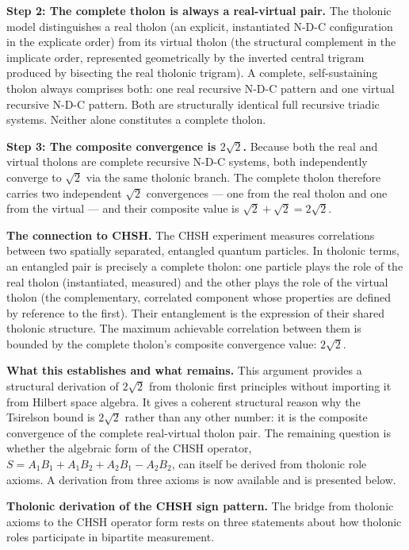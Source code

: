 \documentclass[12pt]{article}
\begin{document}
\textbf{Step 2: The complete tholon is always a real-virtual pair.} The
tholonic model distinguishes a real tholon (an explicit, instantiated
N-D-C configuration in the explicate order) from its virtual tholon (the
structural complement in the implicate order, represented geometrically
by the inverted central trigram produced by bisecting the real tholonic
trigram). A complete, self-sustaining tholon always comprises both: one
real recursive N-D-C pattern and one virtual recursive N-D-C pattern.
Both are structurally identical full recursive triadic systems. Neither
alone constitutes a complete tholon.

\textbf{Step 3: The composite convergence is \(2\sqrt{2}\).} Because
both the real and virtual tholons are complete recursive N-D-C systems,
both independently converge to \(\sqrt{2}\) via the same tholonic
branch. The complete tholon therefore carries two independent
\(\sqrt{2}\) convergences --- one from the real tholon and one from the
virtual --- and their composite value is
\(\sqrt{2} + \sqrt{2} = 2\sqrt{2}\).

\textbf{The connection to CHSH.} The CHSH experiment measures
correlations between two spatially separated, entangled quantum
particles. In tholonic terms, an entangled pair is precisely a complete
tholon: one particle plays the role of the real tholon (instantiated,
measured) and the other plays the role of the virtual tholon (the
complementary, correlated component whose properties are defined by
reference to the first). Their entanglement is the expression of their
shared tholonic structure. The maximum achievable correlation between
them is bounded by the complete tholon's composite convergence value:
\(2\sqrt{2}\).

\textbf{What this establishes and what remains.} This argument provides
a structural derivation of \(2\sqrt{2}\) from tholonic first principles
without importing it from Hilbert space algebra. It gives a coherent
structural reason why the Tsirelson bound is \(2\sqrt{2}\) rather than
any other number: it is the composite convergence of the complete
real-virtual tholon pair. The remaining question is whether the
algebraic form of the CHSH operator,
\(S = A_1B_1 + A_1B_2 + A_2B_1 - A_2B_2\), can itself be derived from
tholonic role axioms. A derivation from three axioms is now available
and is presented below.

\textbf{Tholonic derivation of the CHSH sign pattern.} The bridge from
tholonic axioms to the CHSH operator form rests on three statements
about how tholonic roles participate in bipartite measurement.
\end{document}
